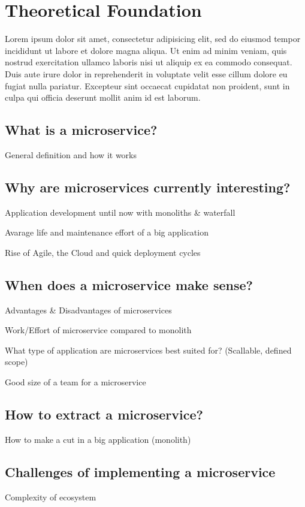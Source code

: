 \chapter{Theoretical Foundation}
\label{sec:found}

Lorem ipsum dolor sit amet, consectetur adipisicing elit, sed do eiusmod
tempor incididunt ut labore et dolore magna aliqua. Ut enim ad minim veniam,
quis nostrud exercitation ullamco laboris nisi ut aliquip ex ea commodo
consequat. Duis aute irure dolor in reprehenderit in voluptate velit esse
cillum dolore eu fugiat nulla pariatur. Excepteur sint occaecat cupidatat non
proident, sunt in culpa qui officia deserunt mollit anim id est laborum.


\section{What is a microservice?}

General definition and how it works


\section{Why are microservices currently interesting?}

Application development until now with monoliths \& waterfall

Avarage life and maintenance effort of a big application

Rise of Agile, the Cloud and quick deployment cycles


\section{When does a microservice make sense?}

Advantages \& Disadvantages of microservices

Work/Effort of microservice compared to monolith

What type of application are microservices best suited for? (Scallable, defined scope)

Good size of a team for a microservice


\section{How to extract a microservice?}

How to make a cut in a big application (monolith)


\section{Challenges of implementing a microservice}

Complexity of ecosystem

